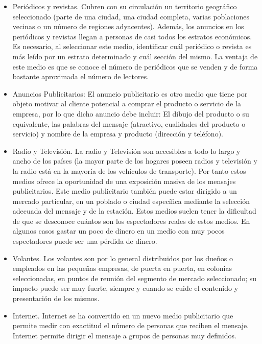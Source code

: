 \begin{itemize}
  \item Periódicos y revistas. Cubren con su circulación un territorio geográfico seleccionado (parte de una ciudad, una ciudad completa, varias poblaciones vecinas o un número de regiones adyacentes). Además, los anuncios en los periódicos y revistas llegan a personas de casi todos los estratos económicos. Es necesario, al seleccionar este medio, identificar cuál periódico o revista es más leído por un estrato determinado y cuál sección del mismo. La ventaja de este medio es que se conoce el número de periódicos que se venden y de forma bastante aproximada el número de lectores.
  \item Anuncios Publicitarios: El anuncio publicitario es otro medio que tiene por objeto motivar al cliente potencial a comprar el producto o servicio de la empresa, por lo que dicho anuncio debe incluir: El dibujo del producto o su equivalente, las palabras del mensaje (atractivo, cualidades del producto o servicio) y nombre de la empresa y producto (dirección y teléfono).
  \item Radio y Televisión. La radio y Televisión son accesibles a todo lo largo y ancho de los países (la mayor parte de los hogares poseen radios y televisión y la radio está en la mayoría de los vehículos de transporte). Por tanto estos medios ofrece la oportunidad de una exposición masiva de los mensajes publicitarios. Este medio publicitario también puede estar dirigido a un mercado particular, en un poblado o ciudad específica mediante la selección adecuada del mensaje y de la estación. Estos medios suelen tener la dificultad de que se desconoce cuántos son los espectadores reales de estos medios. En algunos casos gastar un poco de dinero en un medio con muy pocos espectadores puede ser una pérdida de dinero.
  \item Volantes. Los volantes son por lo general distribuidos por los dueños o empleados en las pequeñas empresas, de puerta en puerta, en colonias seleccionadas, en puntos de reunión del segmento de mercado seleccionado; su impacto puede ser muy fuerte, siempre y cuando se cuide el contenido y presentación de los mismos.
  \item Internet. Internet se ha convertido en un nuevo medio publicitario que permite medir con exactitud el número de personas que reciben el mensaje. Internet permite dirigir el mensaje a grupos de personas muy definidos.
\end{itemize}


